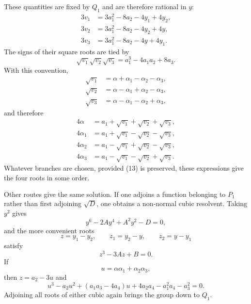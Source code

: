 \documentclass[11pt]{article}
\begin{document}
These quantities are fixed by $Q_1$ and are therefore rational in $y$:
\[
\begin{aligned}
        3v_1&=3a_1^2-8a_2-4y_1+4y_2,\\
        3v_2&=3a_1^2-8a_2-4y_2+4y,\\
        3v_3&=3a_1^2-8a_2-4y+4y_1.
\end{aligned}                                                          \tag{12}
\]
The signs of their square roots are tied by
\[
        \sqrt{v_1}\sqrt{v_2}\sqrt{v_3}=a_1^3-4a_1a_2+8a_3.             \tag{13}
\]
With this convention,
\[
\begin{aligned}
        \sqrt{v_1}&=\alpha+\alpha_1-\alpha_2-\alpha_3,\\
        \sqrt{v_2}&=\alpha-\alpha_1+\alpha_2-\alpha_3,\\
        \sqrt{v_3}&=\alpha-\alpha_1-\alpha_2+\alpha_3,
\end{aligned}                                                          \tag{14}
\]
and therefore
\[
\begin{aligned}
4\alpha   &=a_1+\sqrt{v_1}+\sqrt{v_2}+\sqrt{v_3},\\
4\alpha_1 &=a_1+\sqrt{v_1}-\sqrt{v_2}-\sqrt{v_3},\\
4\alpha_2 &=a_1-\sqrt{v_1}+\sqrt{v_2}-\sqrt{v_3},\\
4\alpha_3 &=a_1-\sqrt{v_1}-\sqrt{v_2}+\sqrt{v_3}.
\end{aligned}                                                          \tag{15}
\]
Whatever branches are chosen, provided (13) is preserved, these expressions give the four roots in some order.

Other routes give the same solution. If one adjoins a function belonging to $P_1$ rather than first adjoining $\sqrt D$, one obtains a non-normal cubic resolvent. Taking $y^2$ gives
\[
        y^6-2Ay^4+A^2y^2-D=0,                                         \tag{16}
\]
and the more convenient roots
\[
        z=y_1-y_2,
        \qquad z_1=y_2-y,
        \qquad z_2=y-y_1                                             \tag{17}
\]
satisfy
\[
        z^3-3Az+B=0.                                                   \tag{18}
\]
If
\[
        u=\alpha\alpha_1+\alpha_2\alpha_3,                             \tag{19}
\]
then $z=a_2-3u$ and
\[
        u^3-a_2u^2+(a_1a_3-4a_4)u+4a_2a_4-a_1^2a_4-a_3^2=0.            \tag{20}
\]
Adjoining all roots of either cubic again brings the group down to $Q_1$.
\end{document}
